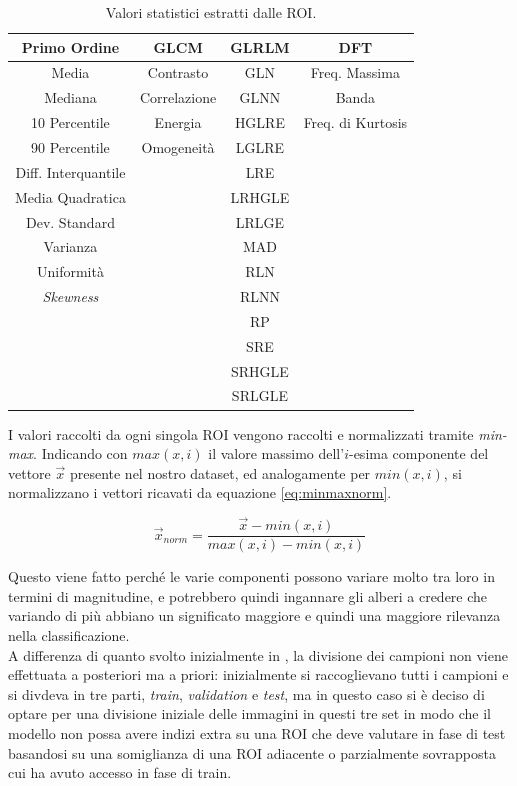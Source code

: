 \begin{table}
        \center
        \begin{tabular}[h]{||c|c|c|c||}
            \hline 
            \textbf{Primo Ordine} & \textbf{GLCM} & \textbf{GLRLM} & \textbf{DFT} \\
            \hline 
            \hline 
            Media & Contrasto & GLN & Freq. Massima \\
            Mediana & Correlazione & GLNN & Banda \\
            10 Percentile & Energia & HGLRE & Freq. di Kurtosis \\
            90 Percentile & Omogeneità & LGLRE & \\
            Diff. Interquantile & & LRE & \\
            Media Quadratica & & LRHGLE & \\
            Dev. Standard & & LRLGE & \\
            Varianza & & MAD & \\
            Uniformità & & RLN & \\
            {\it Skewness} & & RLNN & \\
            & & RP & \\
            & & SRE & \\
            & & SRHGLE & \\
            & & SRLGLE & \\
            \hline 
        \end{tabular}
        \caption{\label{table:features-toma}Valori statistici estratti dalle ROI.}
\end{table}

I valori raccolti da ogni singola ROI vengono raccolti e normalizzati tramite
{\it min-max}. 
Indicando con $max(x,i)$ il valore massimo dell'$i$-esima componente
del vettore $\vec{x}$ presente nel nostro dataset, ed analogamente
per $min(x,i)$, si normalizzano i vettori ricavati da equazione \ref{eq:minmaxnorm}.

\begin{equation}\label{eq:minmaxnorm}
    \vec{x}_{norm} = \frac{\vec{x} - min(x,i)}{max(x,i) - min(x,i)}
\end{equation}

Questo viene fatto perché le varie componenti possono variare molto tra loro
in termini di magnitudine, e potrebbero quindi ingannare gli alberi
a credere che variando di più abbiano un significato maggiore e quindi una
maggiore rilevanza nella classificazione.\\
A differenza di quanto svolto inizialmente in \cite{Toma2022}, la divisione
dei campioni non viene effettuata a posteriori ma a priori:
inizialmente si raccoglievano tutti i campioni e si divdeva in tre parti,
{\it train}, {\it validation} e {\it test}, ma in questo caso si è deciso di optare
per una divisione iniziale delle immagini in questi tre set in modo che
il modello non possa avere indizi extra su una ROI che deve valutare
in fase di test basandosi su una somiglianza di una ROI adiacente o 
parzialmente sovrapposta cui ha avuto accesso in fase di train.


